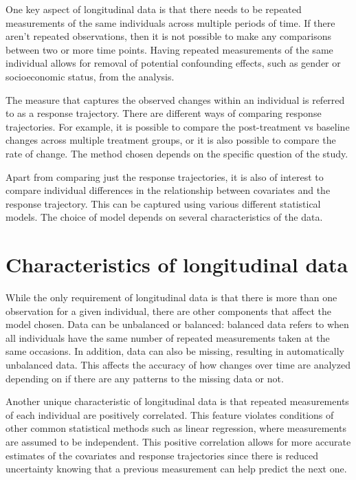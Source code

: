 \documentclass[12pt, twoside]{amherstthesis}
\theoremstyle{definition}
\theoremstyle{definition}
\theoremstyle{definition}
\theoremstyle{remark}
\begin{document}
One key aspect of longitudinal data is that there needs to be repeated measurements of the same individuals across multiple periods of time. If there aren't repeated observations, then it is not possible to make any comparisons between two or more time points. Having repeated measurements of the same individual allows for removal of potential confounding effects, such as gender or socioeconomic status, from the analysis.

The measure that captures the observed changes within an individual is referred to as a response trajectory. There are different ways of comparing response trajectories. For example, it is possible to compare the post-treatment vs baseline changes across multiple treatment groups, or it is also possible to compare the rate of change. The method chosen depends on the specific question of the study.

Apart from comparing just the response trajectories, it is also of interest to compare individual differences in the relationship between covariates and the response trajectory. This can be captured using various different statistical models. The choice of model depends on several characteristics of the data.

\hypertarget{characteristics-of-longitudinal-data}{%
\section{Characteristics of longitudinal data}\label{characteristics-of-longitudinal-data}}

While the only requirement of longitudinal data is that there is more than one observation for a given individual, there are other components that affect the model chosen. Data can be unbalanced or balanced: balanced data refers to when all individuals have the same number of repeated measurements taken at the same occasions. In addition, data can also be missing, resulting in automatically unbalanced data. This affects the accuracy of how changes over time are analyzed depending on if there are any patterns to the missing data or not.

Another unique characteristic of longitudinal data is that repeated measurements of each individual are positively correlated. This feature violates conditions of other common statistical methods such as linear regression, where measurements are assumed to be independent. This positive correlation allows for more accurate estimates of the covariates and response trajectories since there is reduced uncertainty knowing that a previous measurement can help predict the next one.
\end{document}
